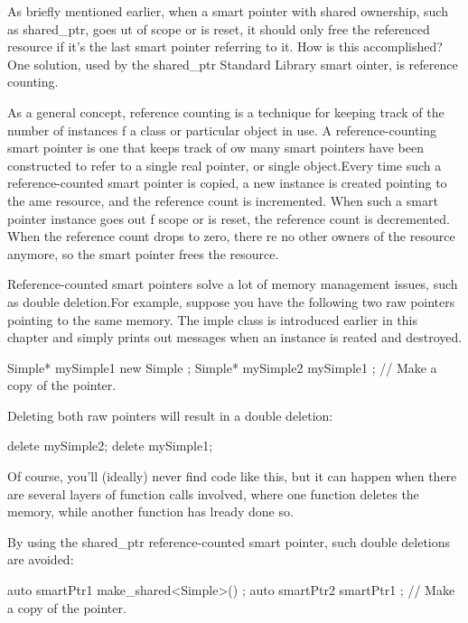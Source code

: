 
As briefly mentioned earlier, when a smart pointer with shared ownership, such as shared\_ptr, goes ut of scope or is reset, it should only free the referenced resource if it’s the last smart pointer referring to it. How is this accomplished? One solution, used by the shared\_ptr Standard Library smart ointer, is reference counting.

As a general concept, reference counting is a technique for keeping track of the number of instances f a class or particular object in use. A reference-counting smart pointer is one that keeps track of ow many smart pointers have been constructed to refer to a single real pointer, or single object.Every time such a reference-counted smart pointer is copied, a new instance is created pointing to the ame resource, and the reference count is incremented. When such a smart pointer instance goes out f scope or is reset, the reference count is decremented. When the reference count drops to zero, there re no other owners of the resource anymore, so the smart pointer frees the resource.

Reference-counted smart pointers solve a lot of memory management issues, such as double deletion.For example, suppose you have the following two raw pointers pointing to the same memory. The imple class is introduced earlier in this chapter and simply prints out messages when an instance is reated and destroyed.

\begin{cpp}
Simple* mySimple1 { new Simple{} };
Simple* mySimple2 { mySimple1 }; // Make a copy of the pointer.
\end{cpp}

Deleting both raw pointers will result in a double deletion:

\begin{cpp}
delete mySimple2;
delete mySimple1;
\end{cpp}

Of course, you’ll (ideally) never find code like this, but it can happen when there are several layers of function calls involved, where one function deletes the memory, while another function has lready done so.

By using the shared\_ptr reference-counted smart pointer, such double deletions are avoided:

\begin{cpp}
auto smartPtr1 { make_shared<Simple>() };
auto smartPtr2 { smartPtr1 }; // Make a copy of the pointer.
\end{cpp}

